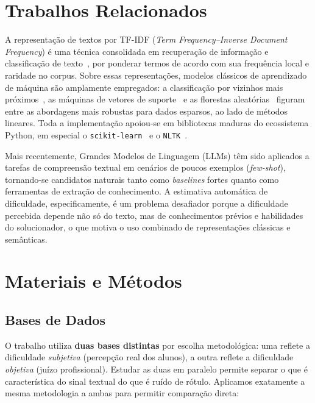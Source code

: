 \documentclass[sigconf]{webmedia}
\begin{document}
\section{Trabalhos Relacionados}

A representação de textos por TF-IDF (\textit{Term Frequency--Inverse Document Frequency}) é uma técnica consolidada em recuperação de informação e classificação de texto~\cite{salton1988}, por ponderar termos de acordo com sua frequência local e raridade no corpus. Sobre essas representações, modelos clássicos de aprendizado de máquina são amplamente empregados: a classificação por vizinhos mais próximos~\cite{coverhart1967}, as máquinas de vetores de suporte~\cite{cortes1995} e as florestas aleatórias~\cite{breiman2001} figuram entre as abordagens mais robustas para dados esparsos, ao lado de métodos lineares. Toda a implementação apoiou-se em bibliotecas maduras do ecossistema Python, em especial o \texttt{scikit-learn}~\cite{pedregosa2011} e o \texttt{NLTK}~\cite{bird2009}.

Mais recentemente, Grandes Modelos de Linguagem (LLMs) têm sido aplicados a tarefas de compreensão textual em cenários de poucos exemplos (\textit{few-shot}), tornando-se candidatos naturais tanto como \textit{baselines} fortes quanto como ferramentas de extração de conhecimento. A estimativa automática de dificuldade, especificamente, é um problema desafiador porque a dificuldade percebida depende não só do texto, mas de conhecimentos prévios e habilidades do solucionador, o que motiva o uso combinado de representações clássicas e semânticas.

\section{Materiais e Métodos}

\subsection{Bases de Dados}
\label{sec:bases}

O trabalho utiliza \textbf{duas bases distintas} por escolha metodológica: uma reflete a dificuldade \emph{subjetiva} (percepção real dos alunos), a outra reflete a dificuldade \emph{objetiva} (juízo profissional). Estudar as duas em paralelo permite separar o que é característica do sinal textual do que é ruído de rótulo. Aplicamos exatamente a mesma metodologia a ambas para permitir comparação direta:
\end{document}
